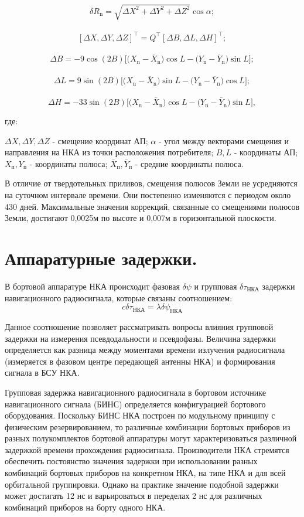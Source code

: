\documentclass[14pt,a4paper,oneside]{extarticle}
\begin{document}
\[\delta R_{\mathrm{n}}=\sqrt{\Delta X^{2}+\Delta Y^{2}+\Delta Z^{2}}\cos\alpha;\] \\
\[[\Delta X,\Delta Y,\Delta Z]^{\intercal}=Q^{\intercal}[\Delta B,\Delta L,\Delta H]^{\intercal};\] \\
\[\Delta B=-9\cos(2B)\big[\big(X_{\mathrm{n}}-\overline{X}_{\mathrm{n}}\big)\cos L-\big(Y_{\mathrm{n}}-\overline{Y}_{\mathrm{n}}\big)\sin L\big]; \] \\
\[\Delta L=9\sin(2B)\big[\big(X_\mathrm{n}-\overline{X}_\mathrm{n}\big)\sin L-\big(Y_\mathrm{n}-\overline{Y}_\mathrm{n}\big)\cos L\big]; \] \\
\[\Delta H=-33\sin(2B)\big[\big(X_{\mathrm{n}}-\overline{X}_{\mathrm{n}}\big)\cos L-\big(Y_{\mathrm{n}}-\overline{Y}_{\mathrm{n}}\big)\sin L\big], \]

где:

$\Delta X, \Delta Y, \Delta Z$ - смещение координат АП;
$\alpha$ - угол между векторами смещения и направления на НКА из точки расположения потребителя; 
$B, L$ - координаты АП;
$X_\text{п}, Y_\text{п}$ - координаты полюса;
$\overline{X}_\text{п}, \overline{Y}_\text{п}$ - средние координаты полюса.

В отличие от твердотельных приливов, смещения полюсов Земли не усредняются на суточном интервале времени. 
Они постепенно изменяются с периодом около 430 дней. 
Максимальные значения коррекций, связанные со смещениями полюсов Земли, достигают 0,0025м по высоте и 0,007м в горизонтальной плоскости.


\section{Аппаратурные задержки.}

В бортовой аппаратуре НКА происходит фазовая $\delta\psi$ и групповая $\delta\tau_\text{НКА}$ задержки навигационного радиосигнала, которые связаны соотношением: \[c\delta\tau_\text{НКА}=\lambda\delta\psi_\text{НКА}\]

Данное соотношение позволяет рассматривать вопросы влияния групповой задержки на измерения псевдодальности и псевдофазы. Величина задержки определяется как разница между моментами времени излучения радиосигнала (измеряется в фазовом центре передающей антенны НКА) и формирования сигнала в БСУ НКА.

Групповая задержка навигационного радиосигнала в бортовом источнике навигационного сигнала (БИНС) определяется конфигурацией бортового оборудования. Поскольку БИНС НКА построен по модульному принципу с физическим резервированием, то различные комбинации бортовых приборов из разных полукомплектов бортовой аппаратуры могут характеризоваться различной задержкой времени прохождения радиосигнала. Производители НКА стремятся обеспечить постоянство значения задержки при использовании разных комбинаций бортовых приборов на конкретном НКА, на типе НКА и для всей орбитальной группировки. Однако на практике значение подобной задержки может достигать 12 нс и варьироваться в переделах 2 нс для различных комбинаций приборов на борту одного НКА.
\end{document}
